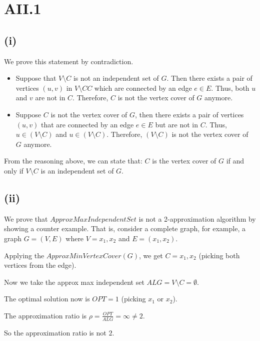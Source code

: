 \section* {AII.1}
\label {a2-1}
\subsection*{(i)}
We prove this statement by contradiction.

\begin{itemize}
	\item Suppose that $V \setminus C$ is not an independent set of $G$. Then there exists a pair of vertices $(u,v)$ in $V \setminus C C$ which are connected by an edge $e \in E$. Thus, both $u$ and $v$ are not in $C$. Therefore, $C$ is not the vertex cover of $G$ anymore.
	\item Suppose $C$ is not the vertex cover of $G$, then there exists a pair of vertices $(u,v)$ that are connected by an edge $e \in E$ but are not in $C$. Thus, $u \in (V \setminus C)$ and $u \in (V \setminus C)$. Therefore, $(V \setminus C)$ is not the vertex cover of $G$ anymore.

\end{itemize}

From the reasoning above, we can state that: $C$ is the vertex cover of $G$ if and only if $V \setminus C$ is an independent set of $G$.

\subsection*{(ii)}
We prove that $ApproxMaxIndependentSet$ is not a 2-approximation algorithm by showing a counter example. That is, consider a complete graph, for example, a graph $G = (V, E)$ where $V = {x_1, x_2}$ and $E = (x_1, x_2)$. 

Applying the $ApproxMinVertexCover(G)$, we get $C = {x_1, x_2}$ (picking both vertices from the edge).

Now we take the approx max independent set $ALG = V \setminus C = \emptyset$.

The optimal solution now is $OPT = 1$ (picking $x_1$ or $x_2$).

The approximation ratio is $\rho = \frac{OPT}{ALG} = \infty \neq 2$.

So the approximation ratio is not $2$.
